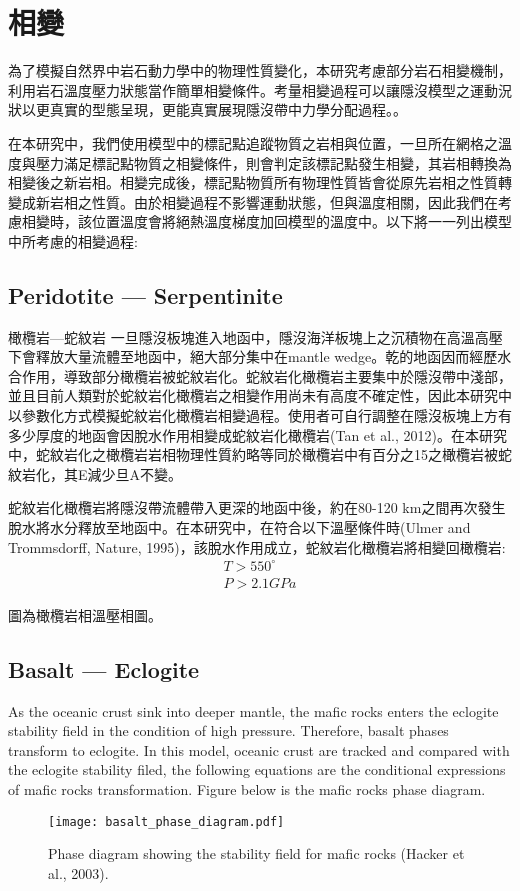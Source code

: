 \section{相變}

為了模擬自然界中岩石動力學中的物理性質變化，本研究考慮部分岩石相變機制，利用岩石溫度壓力狀態當作簡單相變條件。考量相變過程可以讓隱沒模型之運動況狀以更真實的型態呈現，更能真實展現隱沒帶中力學分配過程。。

在本研究中，我們使用模型中的標記點追蹤物質之岩相與位置，一旦所在網格之溫度與壓力滿足標記點物質之相變條件，則會判定該標記點發生相變，其岩相轉換為相變後之新岩相。相變完成後，標記點物質所有物理性質皆會從原先岩相之性質轉變成新岩相之性質。由於相變過程不影響運動狀態，但與溫度相關，因此我們在考慮相變時，該位置溫度會將絕熱溫度梯度加回模型的溫度中。以下將一一列出模型中所考慮的相變過程:

\subsection{Peridotite --- Serpentinite}
橄欖岩---蛇紋岩
一旦隱沒板塊進入地函中，隱沒海洋板塊上之沉積物在高溫高壓下會釋放大量流體至地函中，絕大部分集中在mantle wedge。乾的地函因而經歷水合作用，導致部分橄欖岩被蛇紋岩化。蛇紋岩化橄欖岩主要集中於隱沒帶中淺部，並且目前人類對於蛇紋岩化橄欖岩之相變作用尚未有高度不確定性，因此本研究中以參數化方式模擬蛇紋岩化橄欖岩相變過程。使用者可自行調整在隱沒板塊上方有多少厚度的地函會因脫水作用相變成蛇紋岩化橄欖岩(Tan et al., 2012)。在本研究中，蛇紋岩化之橄欖岩岩相物理性質約略等同於橄欖岩中有百分之15之橄欖岩被蛇紋岩化，其E減少旦A不變。
   
蛇紋岩化橄欖岩將隱沒帶流體帶入更深的地函中後，約在80-120 km之間再次發生脫水將水分釋放至地函中。在本研究中，在符合以下溫壓條件時(Ulmer and Trommsdorff, Nature, 1995)，該脫水作用成立，蛇紋岩化橄欖岩將相變回橄欖岩:
\begin{align}
T> 550 ^{\circ}\\
P > 2.1 GPa
\end{align}

圖為橄欖岩相溫壓相圖。

\subsection{Basalt --- Eclogite}

As the oceanic crust sink into deeper mantle, the mafic rocks enters the eclogite stability field in the condition of high pressure. 
Therefore, basalt phases transform to eclogite.  
In this model, oceanic crust are tracked and compared with the eclogite stability filed, the following equations are the conditional expressions of mafic rocks transformation. 
Figure below is the mafic rocks phase diagram.
\begin{figure*}[ht!]
    \centering
    \texttt{[image: basalt\_phase\_diagram.pdf]}
    \caption{ Phase diagram showing the stability field for mafic rocks (Hacker et al., 2003).  }
    \label{fig:elastic}
\end{figure*}

